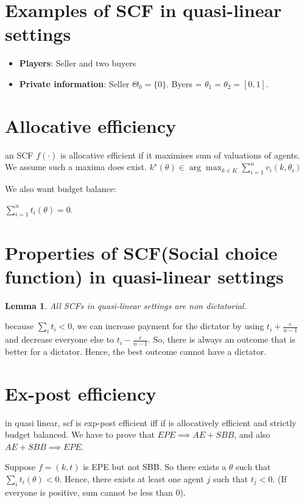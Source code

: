 \documentclass[10pt,a4paper]{article}
\newtheorem{lemma}{Lemma}
\begin{document}
\section{Examples of SCF in quasi-linear settings}
\begin{itemize}
    \item \textbf{Players}: Seller and two buyers
    \item \textbf{Private information}: Seller $\Theta_0 = \{ 0 \}$. Byers = $\theta_1 =\theta_2 = [0, 1]$.
\end{itemize}

\section{Allocative efficiency}
an SCF $f(\cdot)$ is allocative efficient if it maximises sum of valuations
of agents. We assume such a maxima does exist.
$k^{\star}(\theta) \in \arg \max_{k \in K} \sum_{i=1}^n v_i(k, \theta_i)$

We also want budget balance:

$\sum_{i=1}^n t_i(\theta) = 0$.

\section{Properties of SCF(Social choice function) in quasi-linear settings}

\begin{lemma}
All SCFs in quasi-linear settings are non dictatorial.
\end{lemma}

because $\sum_i t_i < 0$, we can increase payment for the dictator by using
$t_i + \frac{e}{n - 1}$ and decrease everyone else to $t_i - \frac{e}{n-1}$.
So, there is always an outcome that is better for a dictator. Hence,
the best outcome cannot have a dictator.

\section{Ex-post efficiency}
in quasi linear, scf is exp-post efficient iff if is allocatively efficient
and strictly budget balanced. We have to prove that $EPE \implies AE + SBB$,
and also $AE + SBB \implies EPE$.

Suppose $f = (k, t)$ is EPE but not SBB. So there exists a $\theta$ such that 
$\sum_i t_i(\theta) < 0$. Hence, there exists at least
one agent $j$ such that $t_j < 0$. (If everyone is positive, sum cannot be less than 0).
\end{document}
